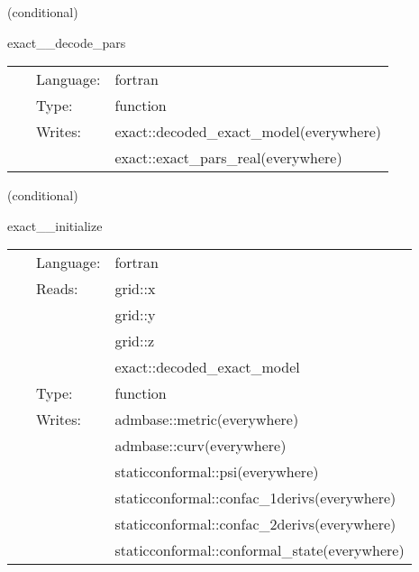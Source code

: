 \vspace{5mm}

   (conditional) 

\hspace{5mm} exact\_\_decode\_pars 

\hspace{5mm}{\it decode/copy thorn exact parameters into grid scalars } 


\hspace{5mm}

 \begin{tabular*}{160mm}{cll} 
~ & Language:  & fortran \\ 
~ & Type:  & function \\ 
~ & Writes:  & exact::decoded\_exact\_model(everywhere) \\ 
~& ~ &exact::exact\_pars\_real(everywhere)\\ 
\end{tabular*} 


\vspace{5mm}

   (conditional) 

\hspace{5mm} exact\_\_initialize 

\hspace{5mm}{\it set data from exact solution on an exact slice } 


\hspace{5mm}

 \begin{tabular*}{160mm}{cll} 
~ & Language:  & fortran \\ 
~ & Reads:  & grid::x \\ 
~& ~ &grid::y\\ 
~& ~ &grid::z\\ 
~& ~ &exact::decoded\_exact\_model\\ 
~ & Type:  & function \\ 
~ & Writes:  & admbase::metric(everywhere) \\ 
~& ~ &admbase::curv(everywhere)\\ 
~& ~ &staticconformal::psi(everywhere)\\ 
~& ~ &staticconformal::confac\_1derivs(everywhere)\\ 
~& ~ &staticconformal::confac\_2derivs(everywhere)\\ 
~& ~ &staticconformal::conformal\_state(everywhere)\\ 
\end{tabular*} 



